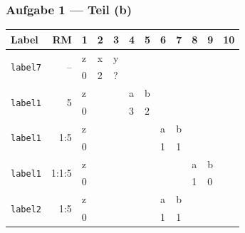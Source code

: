 \documentclass{beamer}
\begin{document}
\begin{frame} \frametitle{Aufgabe 1 --- Teil (b)}
		\centering
		\def\arraystretch{0.9}
	
		\begin{tabular}{|p{1.4cm}|r||R{0.3cm}|R{0.3cm}|R{0.3cm}|R{0.3cm}|R{0.3cm}|R{0.3cm}|R{0.3cm}|R{0.3cm}|R{0.3cm}|R{0.3cm}|}
			\hline
			Label & RM & 1 & 2 & 3 & 4 & 5 & 6 & 7 & 8 & 9 & 10 \\ 
			\hline \hline
			[0]{*}{\texttt{label7}} & [0]{*}{--} & z & x & y &       &       &       &       &       &  &\\
			&       & 0     & 2     & ? &       &       &       &       &       &  &\\ \hline
			[0]{*}{\texttt{label1}} & [0]{*}{5} & z &       &       & a & b &       &       &       &  &\\
			&       & 0     &       &       & 3     & 2     &       &       &       & & \\ \hline
			[0]{*}{\texttt{label1}} & [0]{*}{1:5} & z &       &       &       &       & a & b &       &  &\\
			&       & 0     &       &       &       &       & 1     & 1     &       &  &\\ \hline
			[0]{*}{\texttt{label1}} & [0]{*}{1:1:5} & z &       &       &       &       &       &       & a & b &\\
			&       & 0     &       &       &       &       &       &       & 1     & 0 &\\ \hline
			[0]{*}{\texttt{label2}} & [0]{*}{1:5} & z &       &       &       &       & a & b &       & & \\
			&       & 0     &       &       &       &       & 1     & 1     &       &  & \\ \hline
		\end{tabular}
\end{frame}
\end{document}
